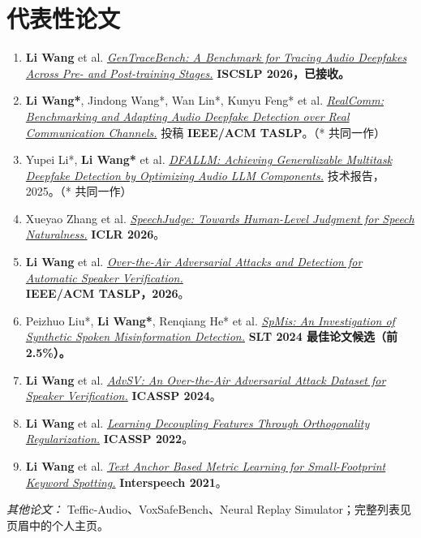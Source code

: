 \documentclass{resume}
\begin{document}
\section{代表性论文}
\begin{enumerate}
  \item \textbf{Li Wang} et al. \href{https://arxiv.org/abs/2609.21738}{\textit{GenTraceBench: A Benchmark for Tracing Audio Deepfakes Across Pre- and Post-training Stages.}} \textbf{ISCSLP 2026，已接收。}
  \item \textbf{Li Wang*}, Jindong Wang*, Wan Lin*, Kunyu Feng* et al. \href{https://wwwwwli.github.io/RealComm/}{\textit{RealComm: Benchmarking and Adapting Audio Deepfake Detection over Real Communication Channels.}} 投稿 \textbf{IEEE/ACM TASLP}。（* 共同一作）
  \item Yupei Li*, \textbf{Li Wang*} et al. \href{https://arxiv.org/abs/2512.08403}{\textit{DFALLM: Achieving Generalizable Multitask Deepfake Detection by Optimizing Audio LLM Components.}} 技术报告，2025。（* 共同一作）
  \item Xueyao Zhang et al. \href{https://arxiv.org/abs/2511.07931}{\textit{SpeechJudge: Towards Human-Level Judgment for Speech Naturalness.}} \textbf{ICLR 2026}。
  \item \textbf{Li Wang} et al. \href{https://ieeexplore.ieee.org/document/11334038}{\textit{Over-the-Air Adversarial Attacks and Detection for Automatic Speaker Verification.}}\\ \textbf{IEEE/ACM TASLP，2026}。
  \item Peizhuo Liu*, \textbf{Li Wang*}, Renqiang He* et al. \href{https://arxiv.org/abs/2409.11308}{\textit{SpMis: An Investigation of Synthetic Spoken Misinformation Detection.}} \textbf{SLT 2024 最佳论文候选（前2.5\%）。}
  \item \textbf{Li Wang} et al. \href{https://arxiv.org/abs/2310.05369}{\textit{AdvSV: An Over-the-Air Adversarial Attack Dataset for Speaker Verification.}} \textbf{ICASSP 2024}。
  \item \textbf{Li Wang} et al. \href{https://ieeexplore.ieee.org/document/9747878}{\textit{Learning Decoupling Features Through Orthogonality Regularization.}} \textbf{ICASSP 2022}。
  \item \textbf{Li Wang} et al. \href{https://www.isca-speech.org/archive/interspeech_2021/wang21da_interspeech.html}{\textit{Text Anchor Based Metric Learning for Small-Footprint Keyword Spotting.}} \textbf{Interspeech 2021}。
\end{enumerate}
\textit{其他论文：} Teffic-Audio、VoxSafeBench、Neural Replay Simulator；完整列表见页眉中的个人主页。
\end{document}

